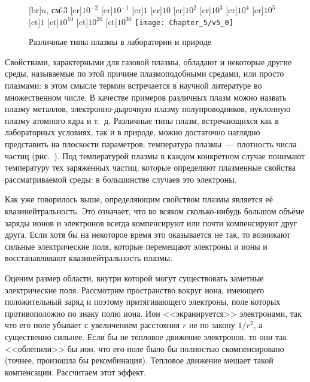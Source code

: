 \begin{figure}[h!]
	[br]{\footnotesize $n$, см\^{-3}}
	[cr]{\footnotesize $10^{-2}$}
	[cr]{\footnotesize $10^{-1}$}
	[cr]{\footnotesize $1$}
	[cr]{\footnotesize $10$}
	[cr]{\footnotesize $10^{2}$}
	[cr]{\footnotesize $10^{3}$}
	[cr]{\footnotesize $10^{4}$}
	[cr]{\footnotesize $10^{5}$}
	[ct]{\footnotesize $1$}
	[ct]{\footnotesize $10^{10}$}
	[ct]{\footnotesize $10^{20}$}
	[ct]{\footnotesize $10^{30}$}
	\texttt{[image: Chapter\_5/v5\_0]}
	\caption{Различные типы плазмы в лаборатории и природе}
\end{figure}

Свойствами, характерными для газовой плазмы, обладают и некоторые другие среды, называемые по этой причине
плазмоподобными средами, или просто плазмами: в этом смысле термин  встречается в научной литературе во множественном числе.
В качестве примеров различных плазм можно назвать плазму металлов, электронно-дырочную плазму
полупроводников, нуклонную плазму атомного ядра и т.~д. Различные типы плазм, встречающихся как в лабораторных условиях,
так и в природе, можно достаточно наглядно представить на плоскости параметров: температура плазмы~--- плотность числа
частиц (рис.~). Под температурой плазмы в каждом конкретном случае понимают температуру тех заряженных частиц, которые
определяют плазменные свойства рассматриваемой среды: в большинстве случаев это электроны.


Как уже говорилось выше, определяющим свойством плазмы является её квазинейтральность. Это означает, что во всяком
сколько-нибудь большом объёме заряды ионов и электронов всегда компенсируют или почти компенсируют друг друга. Если хотя
бы на некоторое время это оказывается не так, то возникают сильные электрические поля, которые перемещают электроны и
ионы и восстанавливают квазинейтральность плазмы.

Оценим размер области, внутри которой могут существовать заметные электрические поля. Рассмотрим пространство вокруг
иона, имеющего положительный заряд и поэтому притягивающего электроны, поле которых противоположно по знаку полю иона.
Ион <<экранируется>> электронами, так что его поле убывает с увеличением расстояния $r$ не по закону $1/r^2$, а
существенно сильнее. Если бы не тепловое движение электронов, то они так <<облепили>> бы ион, что его поле было бы
полностью скомпенсировано (точнее, произошла бы рекомбинация). Тепловое движение мешает такой компенсации. Рассчитаем
этот эффект.

